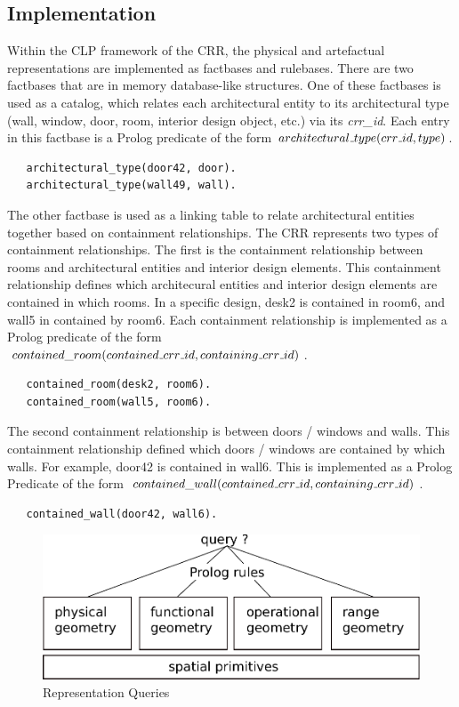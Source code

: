 \documentclass[12pt]{ucthesis}
\begin{document}
\subsection{Implementation}
Within the CLP framework of the CRR, the physical and artefactual representations are implemented as factbases and rulebases. There are two factbases that are in memory database-like structures. One of these factbases is used as a catalog, which relates each architectural entity to its architectural type (wall, window, door, room, interior design object, etc.) via its \emph{crr\_id}. Each entry in this factbase is a Prolog predicate of the form $architectural \mathunderscore type(crr \mathunderscore id, type)$.
\begin{verbatim}
   architectural_type(door42, door).
   architectural_type(wall49, wall).
\end{verbatim} The other factbase is used as a linking table to relate architectural entities together based on containment relationships. The CRR represents two types of containment relationships. The first is the containment relationship between rooms and architectural entities and interior design elements. This containment relationship defines which architecural entities and interior design elements are contained in which rooms. In a specific design, desk2 is contained in room6, and wall5 in contained by room6. Each containment relationship is implemented as a Prolog predicate of the form $contained\_room(contained \mathunderscore crr \mathunderscore id, containing \mathunderscore crr \mathunderscore id)$.
\begin{verbatim}
   contained_room(desk2, room6).
   contained_room(wall5, room6).
\end{verbatim} The second containment relationship is between doors / windows and walls. This containment relationship defined which doors / windows are contained by which walls. For example, door42 is contained in wall6. This is implemented as a Prolog Predicate of the form $contained\_wall(contained \mathunderscore crr \mathunderscore id, containing \mathunderscore crr \mathunderscore id)$.
\begin{verbatim}
   contained_wall(door42, wall6).
\end{verbatim} 

\begin{figure}[h]
\centering
\includegraphics[width=120mm]{clp-design}
\caption{Representation Queries}
\label{clp-design}
\end{figure}
\end{document}
